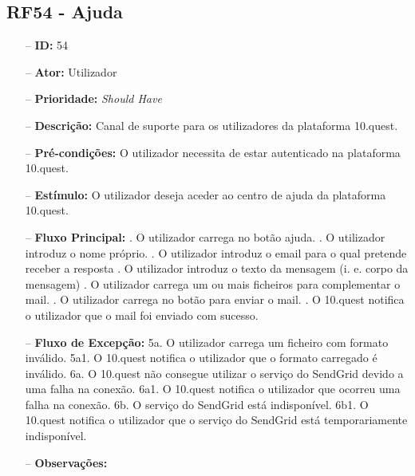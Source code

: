\subsection{RF54 - Ajuda}
\begin{itemize}
	\item[--] \textbf{ID:} 54
	\item[--]  \textbf{Ator:} Utilizador
	\item[--]  \textbf{Prioridade:} \textit{Should Have}
	\item[--]  \textbf{Descrição:} Canal de suporte para os utilizadores da plataforma 10.quest.
	\item[--]  \textbf{Pré-condições:} O utilizador necessita de estar autenticado na plataforma 10.quest.
	\item[--]  \textbf{Estímulo:} O utilizador deseja aceder ao centro de ajuda da plataforma 10.quest.
	\item[--]  \textbf{Fluxo Principal:} 
	. O utilizador carrega no botão ajuda.
	. O utilizador introduz o nome próprio.
	. O utilizador introduz o email para o qual pretende receber a resposta
	. O utilizador introduz o texto da mensagem (i. e. corpo da mensagem)
	. O utilizador carrega um ou mais ficheiros para complementar o mail.
	. O utilizador carrega no botão para enviar o mail.
	. O 10.quest notifica o utilizador que o mail foi enviado com sucesso.
	\item[--]  \textbf{Fluxo de Excepção:} 
	\subitem 5a. O utilizador carrega um ficheiro com formato inválido.
	\subitem 5a1. O 10.quest notifica o utilizador que o formato carregado é inválido.
	\subitem 6a. O 10.quest não consegue utilizar o serviço do SendGrid devido a uma falha na conexão.
	\subitem 6a1. O 10.quest notifica o utilizador que ocorreu uma falha na conexão.
	\subitem 6b. O serviço do SendGrid está indisponível.
	\subitem 6b1. O 10.quest notifica o utilizador que o serviço do SendGrid está temporariamente indisponível. 
	\item[--]  \textbf{Observações:} 
\end{itemize}
\newpage

